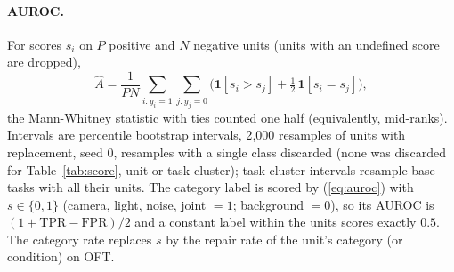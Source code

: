 \documentclass{article}
\begin{document}
\paragraph{AUROC.} For scores $s_i$ on $P$ positive and $N$ negative units (units with an undefined score are dropped),
\begin{equation}
\widehat{A} = \frac{1}{PN} \sum_{i : y_i = 1} \sum_{j : y_j = 0}
\Big( \mathbf{1}[s_i > s_j] + \tfrac12\, \mathbf{1}[s_i = s_j] \Big),
\label{eq:auroc}
\end{equation}
the Mann-Whitney statistic with ties counted one half (equivalently, mid-ranks). Intervals are percentile bootstrap
intervals, 2{,}000 resamples of units with replacement, seed 0, resamples with a single class discarded (none was
discarded for Table~\ref{tab:score}, unit or task-cluster); task-cluster intervals resample base tasks with all their
units. The category label is scored by (\ref{eq:auroc}) with $s \in \{0,
1\}$ (camera, light, noise, joint $=1$; background $=0$), so its AUROC is $(1 + \mathrm{TPR} - \mathrm{FPR})/2$ and a
constant label within the units scores exactly $0.5$. The category rate replaces $s$ by the repair rate of the unit's
category (or condition) on OFT.
\end{document}
